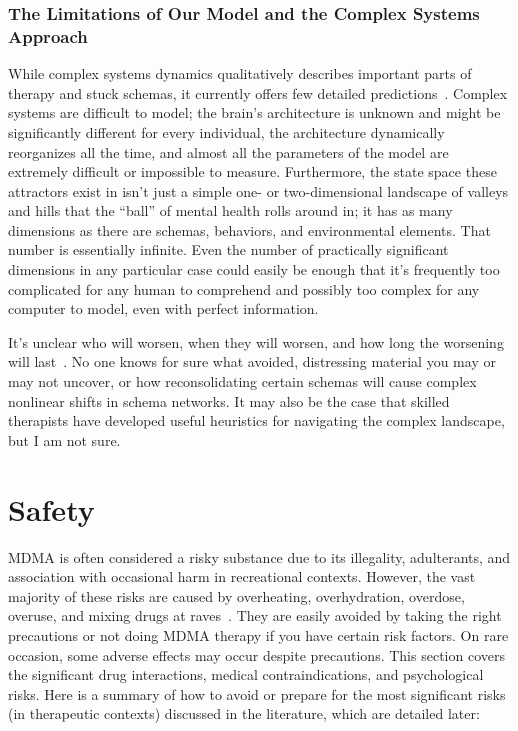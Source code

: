 \documentclass[11pt,oneside]{book}
\let\cite\parencite
\begin{document}
\subsection*{The Limitations of Our Model and the Complex Systems Approach}
While complex systems dynamics qualitatively describes important parts of therapy and stuck schemas, it currently offers few detailed predictions~\cite{hayes2020complex}. Complex systems are difficult to model; the brain's architecture is unknown and might be significantly different for every individual, the architecture dynamically reorganizes all the time, and almost all the parameters of the model are extremely difficult or impossible to measure. Furthermore, the state space these attractors exist in isn't just a simple one- or two-dimensional landscape of valleys and hills that the \enquote{ball} of mental health rolls around in; it has as many dimensions as there are schemas, behaviors, and environmental elements. That number is essentially infinite. Even the number of practically significant dimensions in any particular case could easily be enough that it's frequently too complicated for any human to comprehend and possibly too complex for any computer to model, even with perfect information.

It's unclear who will worsen, when they will worsen, and how long the worsening will last~\cite{hayes2020complex}. No one knows for sure what avoided, distressing material you may or may not uncover, or how reconsolidating certain schemas will cause complex nonlinear shifts in schema networks. It may also be the case that skilled therapists have developed useful heuristics for navigating the complex landscape, but I am not sure.

\chapter{Safety}
\label{sec:safety}
MDMA is often considered a risky substance due to its illegality, adulterants, and association with occasional harm in recreational contexts. However, the vast majority of these risks are caused by overheating, overhydration, overdose, overuse, and mixing drugs at raves~\cite{riggDeaths}. They are easily avoided by taking the right precautions or not doing MDMA therapy if you have certain risk factors. On rare occasion, some adverse effects may occur despite precautions. This section covers the significant drug interactions, medical contraindications, and psychological risks. Here is a summary of how to avoid or prepare for the most significant risks (in therapeutic contexts) discussed in the literature, which are detailed later:
\end{document}
